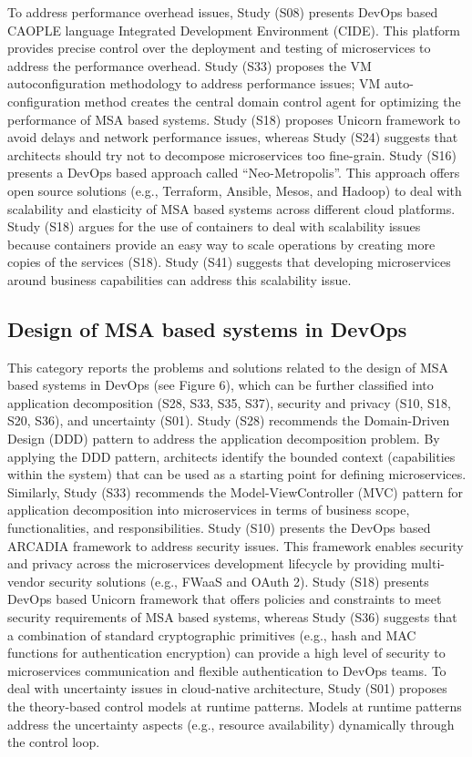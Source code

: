 To address performance overhead issues, Study (S08) presents DevOps based CAOPLE language Integrated Development Environment (CIDE). This platform provides precise control over the deployment and testing of microservices to address the performance overhead. Study (S33) proposes the VM autoconfiguration methodology to address performance issues; VM auto-configuration method creates the central domain control agent for optimizing the performance of MSA based systems. Study (S18) proposes Unicorn framework to avoid delays and network performance issues, whereas Study (S24) suggests that architects should try not to decompose microservices too fine-grain. Study (S16) presents a DevOps based approach called “Neo-Metropolis”. This approach offers open source solutions (e.g., Terraform, Ansible, Mesos, and Hadoop) to deal with scalability and elasticity of MSA based systems across different cloud platforms. Study (S18) argues for the use of containers to deal with scalability issues because containers provide an easy way to scale operations by creating more copies of the services (S18). Study (S41) suggests that developing microservices around business capabilities can address this scalability issue.

\subsection{Design of MSA based systems in DevOps}

This category reports the problems and solutions related to the design of MSA based systems in DevOps (see Figure 6), which can be further classified into application decomposition (S28, S33, S35, S37), security and privacy (S10, S18, S20, S36), and uncertainty (S01). Study (S28) recommends the Domain-Driven Design (DDD) pattern to address the application decomposition problem. By applying the DDD pattern, architects identify the bounded context (capabilities within the system) that can be used as a starting point for defining microservices. Similarly, Study (S33) recommends the Model-ViewController (MVC) pattern for application decomposition into microservices in terms of business scope, functionalities, and responsibilities. Study (S10) presents the DevOps based ARCADIA framework to address security issues. This framework enables security and privacy across the microservices development lifecycle by providing multi-vendor security solutions (e.g., FWaaS and OAuth 2). Study (S18) presents DevOps based Unicorn framework that offers policies and constraints to meet security requirements of MSA based systems, whereas Study (S36) suggests that a combination of standard cryptographic primitives (e.g., hash and MAC functions for authentication encryption) can provide a high level of security to microservices communication and flexible authentication to DevOps teams. To deal with uncertainty issues in cloud-native architecture, Study (S01) proposes the theory-based control models at runtime patterns. Models at runtime patterns address the uncertainty aspects (e.g., resource availability) dynamically through the control loop.

